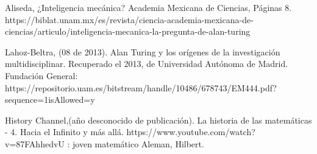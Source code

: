 \documentclass[12pt]{article}
\begin{document}

\newpage


\newpage
\begin{thebibliography}{1}
Aliseda, ¿Inteligencia mecánica? Academia Mexicana de Ciencias, Páginas 8. https://biblat.unam.mx/es/revista/ciencia-academia-mexicana-de-ciencias/articulo/inteligencia-mecanica-la-pregunta-de-alan-turing

Lahoz-Beltra, (08 de 2013). Alan Turing y los orígenes de la investigación multidisciplinar. Recuperado el 2013, de Universidad Autónoma de Madrid. Fundación General: https://repositorio.uam.es/bitstream/handle/10486/678743/EM444.pdf?\\sequence=1isAllowed=y

History Channel,(año desconocido de publicación). La historia de las matemáticas - 4. Hacia el Infinito y más allá. https://www.youtube.com/watch?v=87FAhhedvU : joven matemático Aleman, Hilbert.

\end{thebibliography}
\end{document}
